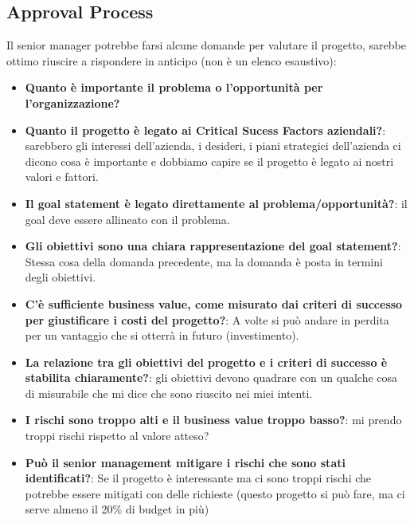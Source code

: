 \subsection{Approval Process}
Il senior manager potrebbe farsi alcune domande per valutare il progetto, sarebbe ottimo riuscire a rispondere in anticipo (non è un elenco esaustivo):
\begin{itemize}
	\item \textbf{Quanto è importante il problema o l'opportunità per l'organizzazione?} 
	\item \textbf{Quanto il progetto è legato ai Critical Sucess Factors aziendali?}: sarebbero gli interessi dell'azienda, i desideri, i piani strategici dell'azienda ci dicono cosa è importante e dobbiamo capire se il progetto è legato ai nostri valori e fattori.
	\item \textbf{Il goal statement è legato direttamente al problema/opportunità?}: il goal deve essere allineato con il problema.
	\item \textbf{Gli obiettivi sono una chiara rappresentazione del goal statement?}: Stessa cosa della domanda precedente, ma la domanda è posta in termini degli obiettivi.
	\item \textbf{C'è sufficiente business value, come misurato dai criteri di successo per giustificare i costi del progetto?}: A volte si può andare in perdita per un vantaggio che si otterrà in futuro (investimento).
	\item \textbf{La relazione tra gli obiettivi del progetto e i criteri di successo è stabilita chiaramente?}: gli obiettivi devono quadrare con un qualche cosa di misurabile che mi dice che sono riuscito nei miei intenti.
	\item \textbf{I rischi sono troppo alti e il business value troppo basso?}: mi prendo troppi rischi rispetto al valore atteso?
	\item \textbf{Può il senior management mitigare i rischi che sono stati identificati?}: Se il progetto è interessante ma ci sono troppi rischi che potrebbe essere mitigati con delle richieste (questo progetto si può fare, ma ci serve almeno il 20\% di budget in più) 
\end{itemize}
\newpage